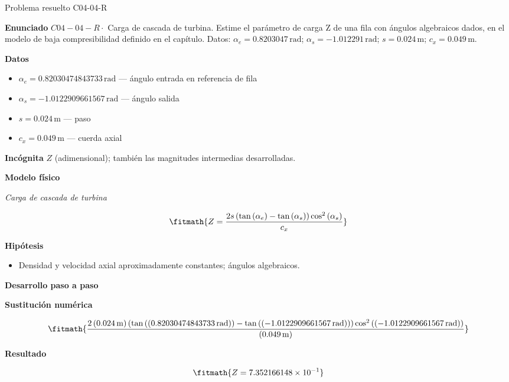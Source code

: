 \documentclass[10pt,openany]{book}
\begin{document}
\begin{studiumworked}{Problema resuelto C04-04-R}


\noindent\textbf{Enunciado}
\(C04-04-R \cdot\) Carga de cascada de turbina. Estime el parámetro de carga Z de una fila con ángulos algebraicos dados, en el modelo de baja compresibilidad definido en el capítulo. Datos: \(\alpha_e=0.8203047\, \mathrm{rad}\); \(\alpha_s=-1.012291\, \mathrm{rad}\); \(s=0.024\, \mathrm{m}\); \(c_x=0.049\, \mathrm{m}\).

\noindent\textbf{Datos}
\begin{itemize}
\item $\alpha_e = 0.82030474843733\,\mathrm{rad}$ — ángulo entrada en referencia de fila
\item $\alpha_s = -1.0122909661567\,\mathrm{rad}$ — ángulo salida
\item $s = 0.024\,\mathrm{m}$ — paso
\item $c_x = 0.049\,\mathrm{m}$ — cuerda axial
\end{itemize}

\noindent\textbf{Incógnita}
$Z$ (adimensional); también las magnitudes intermedias desarrolladas.

\noindent\textbf{Modelo físico}

\noindent\textit{Carga de cascada de turbina}

\[
\fitmath{Z=\frac{2 s \left(\tan{\left(\alpha_e \right)} - \tan{\left(\alpha_s \right)}\right) \cos^{2}{\left(\alpha_s \right)}}{c_x}}
\]

\noindent\textbf{Hipótesis}
\begin{itemize}
\item Densidad y velocidad axial aproximadamente constantes; ángulos algebraicos.
\end{itemize}

\noindent\textbf{Desarrollo paso a paso}



\noindent\textbf{Sustitución numérica}

\[
\fitmath{\frac{2 \left(0.024\,\mathrm{m}\right) \left(\tan{\left(\left(0.82030474843733\,\mathrm{rad}\right) \right)} - \tan{\left(\left(-1.0122909661567\,\mathrm{rad}\right) \right)}\right) \cos^{2}{\left(\left(-1.0122909661567\,\mathrm{rad}\right) \right)}}{\left(0.049\,\mathrm{m}\right)}}
\]

\noindent\textbf{Resultado}

\[
\fitmath{Z=7.352166148\times10^{-1}}
\]


\end{studiumworked}
\end{document}
